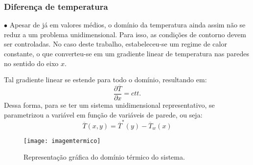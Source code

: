 \documentclass[xcolor=dvipsnames,10pt,aspectratio=169]{beamer}
\begin{document}
		\begin{frame}
			\frametitle{Diferença de temperatura}
			$\bullet$ Apesar de já em valores médios, o domínio da temperatura ainda assim não se reduz a um problema unidimensional. Para isso, as condições de contorno devem ser controladas. No caso deste trabalho, estabeleceu-se um regime de calor constante, o que converteu-se em um gradiente linear de temperatura nas paredes no sentido do eixo $x$.  \\
			\begin{minipage}[h!]{0.32\textwidth}
				Tal gradiente linear se estende para todo o domínio, resultando em:
				\begin{equation}
				\frac{\partial \overline{T}}{\partial x} = ctt.
				\end{equation}
				Dessa forma, para se ter um sistema unidimensional representativo, se parametrizou a variável em função de variáveis de parede, ou seja:
				\begin{equation}
				\overline{T}(x,y) = \overline{T}^\ast(y) - \overline{T}_w(x)
				\end{equation}
			\end{minipage}\hfill
			\begin{minipage}[h!]{0.65\textwidth}
			\begin{figure}
				\centering
				\texttt{[image: imagemtermico]}
				\caption{Representação gráfica do domínio térmico do sistema.}
				\label{temperatura}
			\end{figure}
			\end{minipage}
			
			
		\end{frame}
		
		
		
		
		
\end{document}
